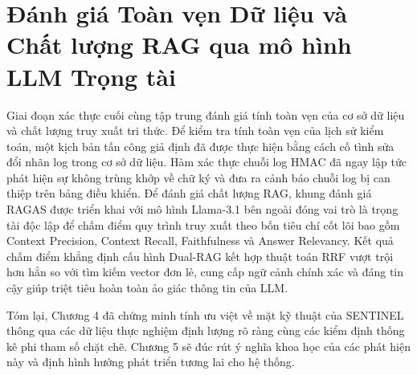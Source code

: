 \section{Đánh giá Toàn vẹn Dữ liệu và Chất lượng RAG qua mô hình LLM Trọng tài}
Giai đoạn xác thực cuối cùng tập trung đánh giá tính toàn vẹn của cơ sở dữ liệu và chất lượng truy xuất tri thức. Để kiểm tra tính toàn vẹn của lịch sử kiểm toán, một kịch bản tấn công giả định đã được thực hiện bằng cách cố tình sửa đổi nhãn log trong cơ sở dữ liệu. Hàm xác thực chuỗi log HMAC đã ngay lập tức phát hiện sự không trùng khớp về chữ ký và đưa ra cảnh báo chuỗi log bị can thiệp trên bảng điều khiển. Để đánh giá chất lượng RAG, khung đánh giá RAGAS được triển khai với mô hình Llama-3.1 bên ngoài đóng vai trò là trọng tài độc lập để chấm điểm quy trình truy xuất theo bốn tiêu chí cốt lõi bao gồm Context Precision, Context Recall, Faithfulness và Answer Relevancy. Kết quả chấm điểm khẳng định cấu hình Dual-RAG kết hợp thuật toán RRF vượt trội hơn hẳn so với tìm kiếm vector đơn lẻ, cung cấp ngữ cảnh chính xác và đáng tin cậy giúp triệt tiêu hoàn toàn ảo giác thông tin của LLM.

Tóm lại, Chương 4 đã chứng minh tính ưu việt về mặt kỹ thuật của SENTINEL thông qua các dữ liệu thực nghiệm định lượng rõ ràng cùng các kiểm định thống kê phi tham số chặt chẽ. Chương 5 sẽ đúc rút ý nghĩa khoa học của các phát hiện này và định hình hướng phát triển tương lai cho hệ thống.
